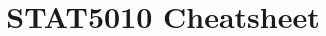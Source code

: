 \documentclass[a4paper, 10pt]{article}
\title{STAT5010 Cheatsheet}
\begin{document}

\footnotesize

\pagestyle{empty}
\setlength{\abovedisplayskip}{3pt}
\setlength{\belowdisplayskip}{2pt}

\begin{multicols*}{3}
    
\end{multicols*}
\end{document}
